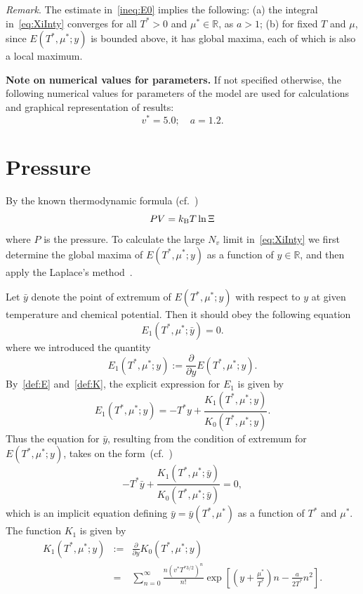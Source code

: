 \documentclass[12pt]{article}
\numberwithin{equation}{section}
\begin{document}
	\textit{Remark}. The estimate in~\eqref{ineq:E0} implies the following: (a) the integral in~\eqref{eq:XiInty} converges for all $T^*>0$ and $\mu^* \in \mathbb{R}$, as $a>1$; (b) for fixed $T$ and $\mu$, since $E(T^*,\mu^*;y)$ is bounded above, it has global maxima, each of which is also a local maximum.
	
	\textbf{Note on numerical values for parameters.} If not specified otherwise, the following numerical values for parameters of the model are used for calculations and graphical representation of results:
	\begin{equation}
		v^* = 5.0; \quad a = 1.2.
	\end{equation}
	
	
	\section{Pressure}
	\label{sec:pres}
	By the known thermodynamic formula (cf.~\cite[(2.16)]{KKD20})
	\begin{equation}
		\label{def:eos}
		P V = k_{\rm B} T \ln \Xi
	\end{equation}
	where $P$ is the pressure. To calculate the large $N_v$ limit in~\eqref{eq:XiInty} we first determine the global maxima of $E(T^*,\mu^*;y)$ as a function of $y \in \mathbb{R}$, and then apply the Laplace's method~\cite{Fedoryuk89,BenderOrszag99}.
	
	Let $\bar{y}$ denote the point of extremum of $E(T^*,\mu^*;y)$ with respect to $y$ at given temperature and chemical potential. Then it should obey the following equation
	\begin{equation}
		\label{cond:extr}
		E_1(T^*,\mu^*;\bar{y}) = 0.
	\end{equation}
	where we introduced the quantity
	\begin{equation}
		\label{def:E1}
		E_1(T^*,\mu^*;y) := \frac{\partial}{\partial y} E(T^*,\mu^*;y).
	\end{equation}
	By~\eqref{def:E} and~\eqref{def:K}, the explicit expression for $E_1$ is given by
	\begin{equation}
		\label{def:reducedE1}
		E_1(T^*,\mu^*;y) = -T^* y + \frac{K_1(T^*,\mu^*;y)}{K_0(T^*,\mu^*;y)}.
	\end{equation}
	Thus the equation for $\bar{y}$, resulting from the condition of extremum for $E(T^*,\mu^*;y)$, takes on the form~(cf.~\cite[(2.19)]{KKD20})
	\begin{equation}
		\label{eq:bar_y}
		-T^* \bar{y} + \frac{K_1(T^*,\mu^*;\bar{y})}{K_0(T^*,\mu^*;\bar{y})} = 0,
	\end{equation}
	which is an implicit equation defining $\bar{y} = \bar{y}(T^*,\mu^*)$ as a function of $T^*$ and $\mu^*$.
	The function $K_1$ is given by
	\begin{eqnarray}
		K_1(T^*,\mu^*;y) & := & \frac{\partial}{\partial y} K_0(T^*,\mu^*;y)
		\nonumber\\
		& = & \sum_{n=0}^{\infty} \frac{n (v^* T^{*3/2})^n}{n!} \exp[\left(y+\frac{\mu^*}{T^*}\right)n - \frac{a}{2T^*}n^2].
	\end{eqnarray}
	
\end{document}
